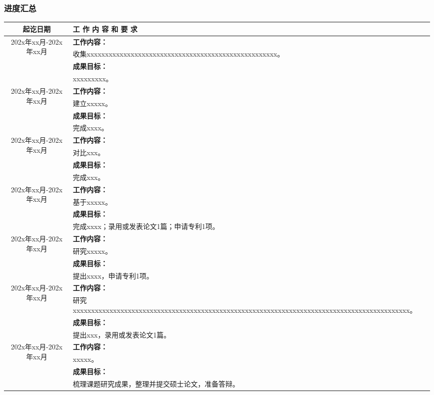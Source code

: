 \documentclass[10pt,aspectratio=169]{beamer}
\begin{document}
\begin{frame}
  \frametitle{进度汇总}
\begin{table}[htbp]
	\centering
	\tiny
	\begin{tabular}{|c|l|}

		\toprule
	 \multicolumn{1}{|p{0.1\paperwidth}|}{\textbf{起讫日期}} & \textbf{工  作  内  容  和  要  求} \\
		\midrule
		\multicolumn{1}{|c|}{\multirow{4}[2]{*}{202x年xx月-202x年xx月}} & \textbf{工作内容：} \\
		& 收集xxxxxxxxxxxxxxxxxxxxxxxxxxxxxxxxxxxxxxxxxxxxxxxxxxxx。 \\
		& \textbf{成果目标：} \\
		& xxxxxxxxx。 \\
		\midrule
		\multicolumn{1}{|c|}{\multirow{4}[2]{*}{202x年xx月-202x年xx月}} & \textbf{工作内容：} \\
		& 建立xxxxx。 \\
		& \textbf{成果目标：} \\
		& 完成xxxx。 \\
		\midrule
		\multicolumn{1}{|c|}{\multirow{4}[2]{*}{202x年xx月-202x年xx月}} & \textbf{工作内容：} \\
		& 对比xxx。 \\
		& \textbf{成果目标：} \\
		& 完成xxx。 \\
		\midrule
		\multicolumn{1}{|c|}{\multirow{4}[2]{*}{202x年xx月-202x年xx月}} & \textbf{工作内容：} \\
		& 基于xxxxx。 \\
		& \textbf{成果目标：} \\
		& 完成xxxx；录用或发表论文1篇；申请专利1项。 \\
		\midrule
		\multicolumn{1}{|c|}{\multirow{4}[2]{*}{202x年xx月-202x年xx月}} & \textbf{工作内容：} \\
		& 研究xxxxx。 \\
		& \textbf{成果目标：} \\
		& 提出xxxx，申请专利1项。 \\
		\midrule
		\multicolumn{1}{|c|}{\multirow{4}[2]{*}{202x年xx月-202x年xx月}} & \textbf{工作内容：} \\
		& 研究xxxxxxxxxxxxxxxxxxxxxxxxxxxxxxxxxxxxxxxxxxxxxxxxxxxxxxxxxxxxxxxxxxxxxxxxxxxxxxxxxxxxxxxxxxxx。 \\
		& \textbf{成果目标：} \\
		& 提出xxx，录用或发表论文1篇。 \\
		\midrule
		\multicolumn{1}{|c|}{\multirow{4}[2]{*}{202x年xx月-202x年xx月}} & \textbf{工作内容：} \\
		& xxxxx。 \\
		& \textbf{成果目标：} \\
     	& 梳理课题研究成果，整理并提交硕士论文，准备答辩。 \\
		\bottomrule
	

\end{tabular}
\end{table}
\end{frame}
\end{document}
